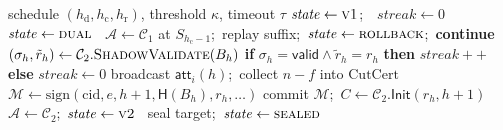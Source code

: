 \documentclass[journal]{IEEEtran}
\begin{document}
\begin{algorithm}[t]
\caption{SAGE per-height controller at a correct validator}
\label{alg:sage}
\begin{algorithmic}[1]
\Require schedule $(h_{\mathrm{d}}, h_{\mathrm{c}}, h_{\mathrm{r}})$, threshold $\kappa$, timeout $\tau$
\State $\mathit{state} \gets \textsc{v1}$;\ \ $\mathit{streak} \gets 0$
  \ $\mathit{state}\gets\textsc{dual}$\ \EndIf
     \State $\mathcal{A}\gets\mathcal{C}_1$ at $S_{h_{\mathrm{c}}-1}$;\ replay suffix;\ $\mathit{state}\gets\textsc{rollback}$;\ \textbf{continue}
  \EndIf
     \State $(\sigma_h,\tilde r_h)\gets\mathcal{C}_2.\textsc{ShadowValidate}(B_h)$
     \State \textbf{if} $\sigma_h{=}\mathsf{valid}\wedge\tilde r_h{=}r_h$ \textbf{then} $\mathit{streak}{+}{+}$ \textbf{else} $\mathit{streak}\gets 0$
        \State broadcast $\mathsf{att}_i(h)$;\ collect $n{-}f$ into $\mathrm{CutCert}$
           \State $\mathcal{M}\gets\mathrm{sign}(\mathrm{cid},e,h{+}1,\mathsf{H}(B_h),r_h,\ldots)$
           \State commit $\mathcal{M}$;\ $C\gets\mathcal{C}_2.\mathsf{Init}(r_h,h{+}1)$
           \State $\mathcal{A}\gets\mathcal{C}_2$;\ $\mathit{state}\gets\textsc{v2}$
        \EndIf
     \EndIf
  \EndIf
  \ seal target;\ $\mathit{state}\gets\textsc{sealed}$ \EndIf
\EndFor
\end{algorithmic}
\end{algorithm}
\end{document}
